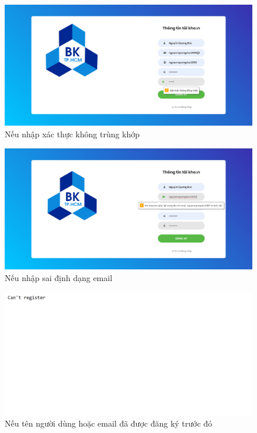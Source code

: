 \documentclass[a4paper]{article}
\begin{document}
	\begin{figure}[H]
		\centering
		\includegraphics[scale=0.36]{password_not_match_register.png}
		\caption{Nếu nhập xác thực không trùng khớp}
		\label{F:password_not_match_register}
	\end{figure}
	
	\begin{figure}[H]
		\centering
		\includegraphics[scale=0.36]{check_email.png}
		\caption{Nếu nhập sai định dạng email}
		\label{F:check_email}
	\end{figure}
	
	\begin{figure}[H]
		\centering
		\includegraphics[scale=0.8]{can_not_register.png}
		\caption{Nếu tên người dùng hoặc email đã được đăng ký trước đó}
		\label{F:can_not_register}
	\end{figure}
	
\end{document}
